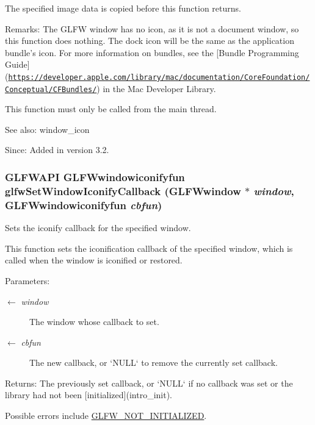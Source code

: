 The specified image data is copied before this function returns.

\begin{Desc}
\item[Remarks:]The GLFW window has no icon, as it is not a document window, so this function does nothing. The dock icon will be the same as the application bundle's icon. For more information on bundles, see the \mbox{[}Bundle Programming Guide\mbox{]}(\href{https://developer.apple.com/library/mac/documentation/CoreFoundation/Conceptual/CFBundles/}{\tt https://developer.apple.com/library/mac/documentation/CoreFoundation/Conceptual/CFBundles/}) in the Mac Developer Library.\end{Desc}
This function must only be called from the main thread.

\begin{Desc}
\item[See also:]window\_\-icon\end{Desc}
\begin{Desc}
\item[Since:]Added in version 3.2. \end{Desc}
\hypertarget{group__window_g17cd86946117b56c76397530900519db}{
\subsubsection[glfwSetWindowIconifyCallback]{\setlength{\rightskip}{0pt plus 5cm}GLFWAPI {\bf GLFWwindowiconifyfun} glfwSetWindowIconifyCallback ({\bf GLFWwindow} $\ast$ {\em window}, \/  {\bf GLFWwindowiconifyfun} {\em cbfun})}}
\label{group__window_g17cd86946117b56c76397530900519db}


Sets the iconify callback for the specified window. 

This function sets the iconification callback of the specified window, which is called when the window is iconified or restored.

\begin{Desc}
\item[Parameters:]
\begin{description}
\item[\mbox{$\leftarrow$} {\em window}]The window whose callback to set. \item[\mbox{$\leftarrow$} {\em cbfun}]The new callback, or `NULL` to remove the currently set callback. \end{description}
\end{Desc}
\begin{Desc}
\item[Returns:]The previously set callback, or `NULL` if no callback was set or the library had not been \mbox{[}initialized\mbox{]}(intro\_\-init).\end{Desc}
Possible errors include \hyperlink{group__errors_g2374ee02c177f12e1fa76ff3ed15e14a}{GLFW\_\-NOT\_\-INITIALIZED}.

